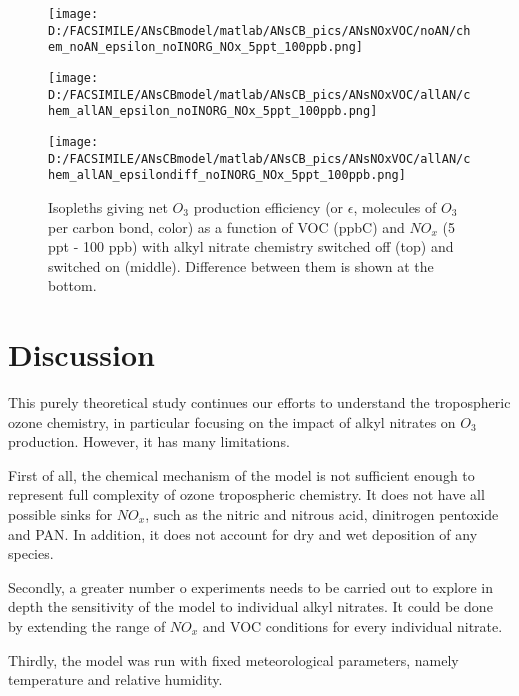 \documentclass[11pt,a4paper]{article}
\begin{document}
\begin{figure} %
\centering
\begin{minipage}{.5\textwidth}
  \centering
  \texttt{[image: D:/FACSIMILE/ANsCBmodel/matlab/ANsCB\_pics/ANsNOxVOC/noAN/chem\_noAN\_epsilon\_noINORG\_NOx\_5ppt\_100ppb.png]}
\end{minipage}
\begin{minipage}{.5\textwidth}
  \centering
  \texttt{[image: D:/FACSIMILE/ANsCBmodel/matlab/ANsCB\_pics/ANsNOxVOC/allAN/chem\_allAN\_epsilon\_noINORG\_NOx\_5ppt\_100ppb.png]}
\end{minipage}
\begin{minipage}{.5\textwidth}
  \centering
  \texttt{[image: D:/FACSIMILE/ANsCBmodel/matlab/ANsCB\_pics/ANsNOxVOC/allAN/chem\_allAN\_epsilondiff\_noINORG\_NOx\_5ppt\_100ppb.png]}
\end{minipage}
\caption{Isopleths giving net $O_3$ production efficiency (or $\epsilon$, molecules of $O_3$ per carbon bond, color) as a function of VOC (ppbC) and $NO_x$ (5 ppt - 100 ppb) with alkyl nitrate chemistry switched off (top) and switched on (middle). Difference between them is shown at the bottom.}\label{fig:epsilon5ppt100ppb}
\end{figure}
\section{Discussion} \label{sec:discuss}
This purely theoretical study continues our efforts to understand the tropospheric ozone chemistry, in particular focusing on the impact of alkyl nitrates on $O_3$ production. However, it has many limitations.

First of all, the chemical mechanism of the model is not sufficient enough to represent full complexity of ozone tropospheric chemistry. It does not have all possible sinks for $NO_x$, such as the nitric and nitrous acid, dinitrogen pentoxide and PAN. In addition, it does not account for dry and wet deposition of any species.

Secondly, a greater number o experiments needs to be carried out to explore in depth the sensitivity of the model to individual alkyl nitrates. It could be done by extending the range of $NO_x$ and VOC conditions for every individual nitrate.

Thirdly, the model was run with fixed meteorological parameters, namely temperature and relative humidity.
\end{document}
